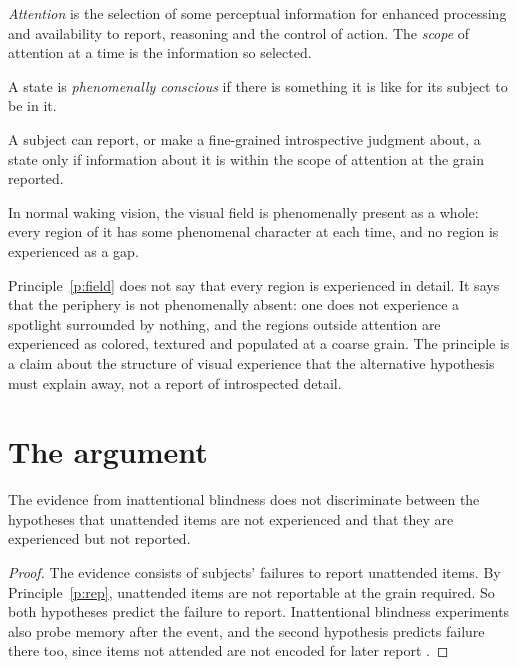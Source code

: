 \documentclass{situationist-preprint}
\begin{document}
\begin{definition}\label{d:att}
\emph{Attention} is the selection of some perceptual information for enhanced processing and availability to report, reasoning and the control of action. The \emph{scope} of attention at a time is the information so selected.
\end{definition}

\begin{definition}\label{d:pc}
A state is \emph{phenomenally conscious} if there is something it is like for its subject to be in it.
\end{definition}

\begin{principle}\label{p:rep}
A subject can report, or make a fine-grained introspective judgment about, a state only if information about it is within the scope of attention at the grain reported.
\end{principle}

\begin{principle}\label{p:field}
In normal waking vision, the visual field is phenomenally present as a whole: every region of it has some phenomenal character at each time, and no region is experienced as a gap.
\end{principle}

Principle~\ref{p:field} does not say that every region is experienced in detail. It says that the periphery is not phenomenally absent: one does not experience a spotlight surrounded by nothing, and the regions outside attention are experienced as colored, textured and populated at a coarse grain. The principle is a claim about the structure of visual experience that the alternative hypothesis must explain away, not a report of introspected detail.

\section{The argument}

\begin{lemma}\label{l:under}
The evidence from inattentional blindness does not discriminate between the hypotheses that unattended items are not experienced and that they are experienced but not reported.
\end{lemma}

\begin{proof}
The evidence consists of subjects' failures to report unattended items. By Principle~\ref{p:rep}, unattended items are not reportable at the grain required. So both hypotheses predict the failure to report. Inattentional blindness experiments also probe memory after the event, and the second hypothesis predicts failure there too, since items not attended are not encoded for later report \citep{Wolfe1999}.
\end{proof}
\end{document}
